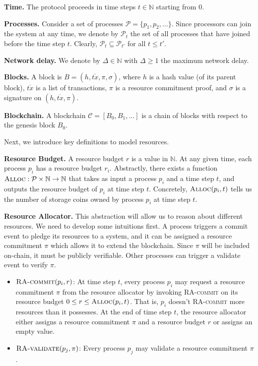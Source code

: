 \documentclass[12pt,draftcls,onecolumn]{IEEEtran}
\newcommand{\Alloc}{\textsc{Alloc}}
\begin{document}
{\bf Time.} The protocol proceeds in time steps $t \in \mathbb{N}$ starting from $0$.

{\bf Processes.} Consider a set of processes $\mathcal{P} = \{ p_1, p_2, \ldots \}$. Since processors can join the system at any time,
we denote by $\mathcal{P}_t$ the set of all processes that have joined before the time step $t$. Clearly, $\mathcal{P}_t \subseteq \mathcal{P}_{t'}$ 
for all $t \le t'$.

{\bf Network delay.} We denote by $\Delta \in \mathbb{N}$ with $\Delta \ge 1$ the maximum network delay.

{\bf Blocks.} A block is $B = (h, \overline{tx}, \pi, \sigma)$, where $h$ is a hash value (of its parent block), $\overline{tx}$ is a list of transactions,
$\pi$ is a resource commitment proof, and $\sigma$ is a signature on $(h, \overline{tx}, \pi)$.

{\bf Blockchain.} A blockchain $\mathcal{C} = [B_0, B_1, \ldots]$ is a chain of blocks with respect to the genesis block $B_0$.

Next, we introduce key definitions to model resources.

{\bf Resource Budget.} A resource budget $r$ is a value in $\mathbb{N}$. At any given time, each process $p_i$ has a resource budget $r_i$.
Abstractly, there exists a function $\Alloc: \mathcal{P} \times \mathbb{N} \to \mathbb{N}$ that takes as input a process $p_i$
and a time step $t$, and outputs the resource budget of $p_i$ at time step $t$. Concretely, $\Alloc(p_i, t)$ tells us the number of storage coins
owned by process $p_i$ at time step $t$.

{\bf Resource Allocator.} This abstraction will allow us to reason about different resources. We need to develop some intuitions first. 
A process triggers a commit event to pledge its resources to a system, and it can be assigned a resource commitment $\pi$ which allows it to extend the blockchain. Since $\pi$ will be included on-chain, it must be publicly verifiable. Other processes can trigger a validate event to verify $\pi$.

\begin{itemize}
    \item $\textsc{RA-commit}(p_i, r)$: At time step $t$, every process $p_i$ may request a resource commitment $\pi$ from the resource allocator
    by invoking \textsc{RA-commit} on its resource budget $0 \le r \le \Alloc(p_i, t)$. That is, $p_i$ doesn't \textsc{RA-commit} more resources than it possesses. At the end of time step $t$, the resource allocator either assigns a resource commitment $\pi$ and a resource budget $r$ or assigns an empty value.

    \item $\textsc{RA-validate}(p_j, \pi)$: Every process $p_j$ may validate a resource commitment $\pi$.
\end{itemize}
\end{document}
